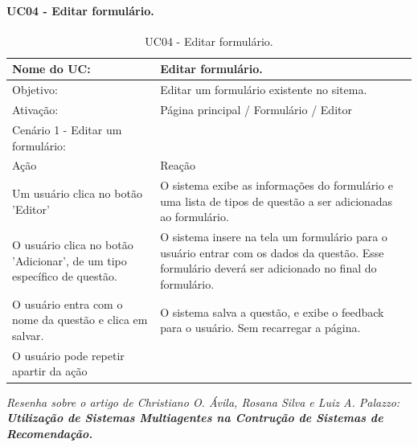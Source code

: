 \documentclass[11pt]{article}
\begin{document}
      \paragraph{UC04 - Editar formulário.} \hspace{10pt}

      \begin{table}[h]
        \begin{center}
          \begin{tabular}{ | p{7cm} | p{8cm} | }
            \hline
            Nome do UC: \cellcolor{gray} & Editar formulário. \\
            \hline
            Objetivo: \cellcolor{gray} & Editar um formulário existente no sitema. \\
            \hline
            Ativação: \cellcolor{gray} & Página principal / Formulário / Editor \\
            \hline
            \hline
            Cenário 1 - Editar um formulário: &  \\
            \hline
            Ação\cellcolor{gray} & Reação\cellcolor{gray} \\
            \hline
            Um usuário clica no botão 'Editor' & O sistema exibe as informações do formulário e uma lista de tipos de questão a ser adicionadas ao formulário. \\
            \hline
            O usuário clica no botão 'Adicionar', de um tipo específico de questão. & O sistema insere na tela um formulário para o usuário entrar com os dados da questão. Esse formulário deverá ser adicionado no final do formulário. \\
            \hline
            O usuário entra com o nome da questão e clica em salvar. & O sistema salva a questão, e exibe o feedback para o usuário. Sem recarregar a página. \\
            \hline
            O usuário pode repetir apartir da ação #2 quantas vezes desejar. &  \\
            \hline
          \end{tabular}
          \caption{UC04 - Editar formulário.}
        \end{center}
      \end{table}
      
      
      
      
      


      


  

  {\em Resenha sobre o artigo de Christiano O. Ávila, Rosana Silva e Luiz 
  A. Palazzo: {\bf Utilização de Sistemas Multiagentes na Contrução de Sistemas de Recomendação.}}
  \\\\
\end{document}
